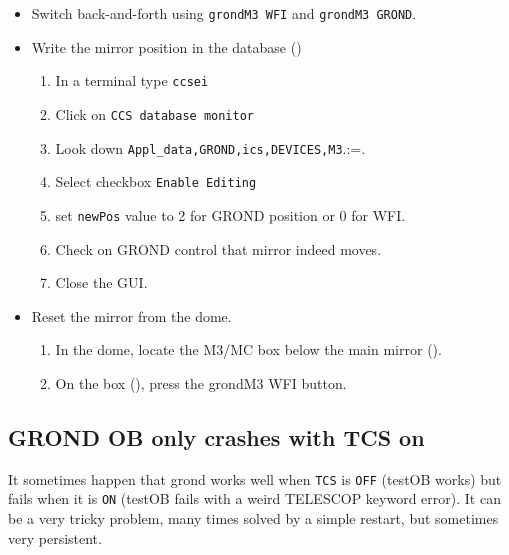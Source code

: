 \documentclass[11pt,fleqn,a4paper]{book}
\makeatletter
\def\menu#1#2{\texttt{#1}\ifx{}#2\else\@for\@x:=#2\do{$\rightarrow$\texttt{\@x}}\fi}
\makeatother
\begin{document}
\label{proc:grondM3stuck}
\begin{itemize}
  \item Switch back-and-forth using \texttt{\gls{grondM3} WFI} and \texttt{\gls{grondM3} GROND}.
  \item Write the mirror position in the database ()
    \begin{enumerate}
      \item In a terminal type \texttt{ccsei}
      \item Click on \texttt{CCS database monitor} 
      \item Look down \menu{Appl\_data,GROND,\gls{ics},DEVICES,\gls{M3}}.
      \item Select checkbox \texttt{Enable Editing}
      \item set \texttt{newPos} value to 2 for GROND position or 0 for WFI.
      \item Check on GROND control that mirror indeed moves.
      \item Close the GUI.
    \end{enumerate}
  \item Reset the mirror from the dome.
    \begin{enumerate}
       \item In the \gls{dome}, locate the \gls{M3}/MC box below the \gls{main mirror} ().
       \item On the box (), press the \gls{grondM3} WFI button.
    \end{enumerate}
\end{itemize}

\subsection{GROND OB only crashes with TCS on}

It sometimes happen that \gls{grond} works well when \texttt{TCS} is \texttt{OFF} (testOB works) but fails when it is \texttt{ON} (testOB fails with a weird TELESCOP keyword error). It can be a very tricky problem, many times solved by a simple restart, but sometimes very persistent. 
\end{document}
